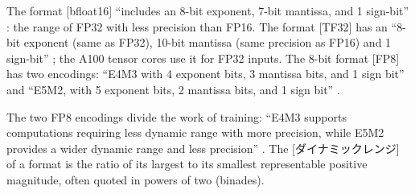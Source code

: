 \documentclass[../main.tex]{subfiles}
\begin{document}
\begin{definition}[ML formats]
  The format [bfloat16] \enquote{includes an 8-bit exponent,
  7-bit mantissa, and 1 sign-bit} \cite{nvidia2020ampere}: the range of
  FP32 with less precision than FP16.
  The format [TF32] has an \enquote{8-bit exponent
  (same as FP32), 10-bit mantissa (same precision as FP16) and 1
  sign-bit} \cite{nvidia2020ampere}; the A100 tensor cores use it for
  FP32 inputs.  The 8-bit format [FP8] has two encodings: \enquote{E4M3 with 4
  exponent bits, 3 mantissa bits, and 1 sign bit} and \enquote{E5M2,
  with 5 exponent bits, 2 mantissa bits, and 1 sign bit}
  \cite{nvidia2022hopper}.
\end{definition}

The two FP8 encodings divide the work of training: \enquote{E4M3
supports computations requiring less dynamic range with more precision,
while E5M2 provides a wider dynamic range and less precision}
\cite{nvidia2022hopper}.  The
[ダイナミックレンジ] of a format is the ratio of
its largest to its smallest representable positive magnitude, often
quoted in powers of two (binades).
\end{document}
